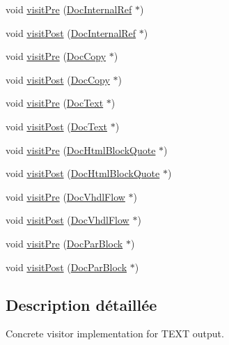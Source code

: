 \begin{DoxyCompactItemize}
\item 
void \hyperlink{class_text_doc_visitor_abb0d6a34a488be8eba07efe0c150cf80}{visit\+Pre} (\hyperlink{class_doc_internal_ref}{Doc\+Internal\+Ref} $\ast$)
\item 
void \hyperlink{class_text_doc_visitor_a7f7ef2d7caf021e2c95864eff16c0d64}{visit\+Post} (\hyperlink{class_doc_internal_ref}{Doc\+Internal\+Ref} $\ast$)
\item 
void \hyperlink{class_text_doc_visitor_a743ff996fca0fed1ff7a2e6763bc8d07}{visit\+Pre} (\hyperlink{class_doc_copy}{Doc\+Copy} $\ast$)
\item 
void \hyperlink{class_text_doc_visitor_afff2e22ab2ecd55e66f78fded11e10f7}{visit\+Post} (\hyperlink{class_doc_copy}{Doc\+Copy} $\ast$)
\item 
void \hyperlink{class_text_doc_visitor_a77a061525d416bfe72260425a86f9899}{visit\+Pre} (\hyperlink{class_doc_text}{Doc\+Text} $\ast$)
\item 
void \hyperlink{class_text_doc_visitor_a3dbf53e4bed0be89e3aea73bf55b3000}{visit\+Post} (\hyperlink{class_doc_text}{Doc\+Text} $\ast$)
\item 
void \hyperlink{class_text_doc_visitor_ab7db73e09e5bfb036ffc927143210633}{visit\+Pre} (\hyperlink{class_doc_html_block_quote}{Doc\+Html\+Block\+Quote} $\ast$)
\item 
void \hyperlink{class_text_doc_visitor_a2a9634a60c800d55afeecbe916a9be8b}{visit\+Post} (\hyperlink{class_doc_html_block_quote}{Doc\+Html\+Block\+Quote} $\ast$)
\item 
void \hyperlink{class_text_doc_visitor_a22ec0435be2bd342a20dc7411ef4c0fa}{visit\+Pre} (\hyperlink{class_doc_vhdl_flow}{Doc\+Vhdl\+Flow} $\ast$)
\item 
void \hyperlink{class_text_doc_visitor_aec7471dc0d99a4aba611edf2037113a5}{visit\+Post} (\hyperlink{class_doc_vhdl_flow}{Doc\+Vhdl\+Flow} $\ast$)
\item 
void \hyperlink{class_text_doc_visitor_a99916260024c5ac431e2d0fdd5aa0e8e}{visit\+Pre} (\hyperlink{class_doc_par_block}{Doc\+Par\+Block} $\ast$)
\item 
void \hyperlink{class_text_doc_visitor_a67c063eb9c4301eefaa23601916bdba8}{visit\+Post} (\hyperlink{class_doc_par_block}{Doc\+Par\+Block} $\ast$)
\end{DoxyCompactItemize}


\subsection{Description détaillée}
Concrete visitor implementation for T\+E\+X\+T output. 

